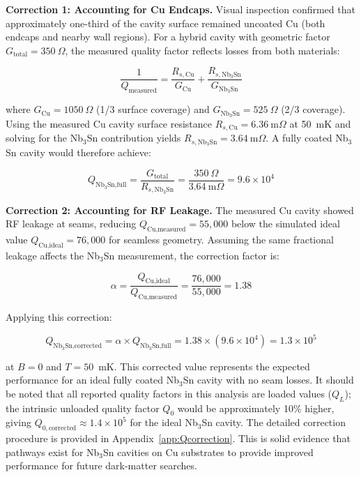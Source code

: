     \textbf{Correction 1: Accounting for Cu Endcaps.} Visual inspection confirmed that approximately one-third of the cavity surface remained uncoated Cu (both endcaps and nearby wall regions). For a hybrid cavity with geometric factor $G_\text{total} = 350~\Omega$, the measured quality factor reflects losses from both materials:
    
    \begin{equation}
    \frac{1}{Q_\text{measured}} = \frac{R_{s,\text{Cu}}}{G_\text{Cu}} + \frac{R_{s,\text{Nb$_3$Sn}}}{G_\text{Nb$_3$Sn}}
    \end{equation}
    
    \noindent where $G_\text{Cu} = 1050~\Omega$ (1/3 surface coverage) and $G_\text{Nb$_3$Sn} = 525~\Omega$ (2/3 coverage). Using the measured Cu cavity surface resistance $R_{s,\text{Cu}} = 6.36~\text{m}\Omega$ at 50~mK and solving for the Nb$_3$Sn contribution yields $R_{s,\text{Nb$_3$Sn}} = 3.64~\text{m}\Omega$. A fully coated Nb$_3$Sn cavity would therefore achieve:
    
    \begin{equation}
    Q_\text{Nb$_3$Sn,full} = \frac{G_\text{total}}{R_{s,\text{Nb$_3$Sn}}} = \frac{350~\Omega}{3.64~\text{m}\Omega} = 9.6 \times 10^4
    \end{equation}
    
    \textbf{Correction 2: Accounting for RF Leakage.} The measured Cu cavity showed RF leakage at seams, reducing $Q_\text{Cu,measured} = 55{,}000$ below the simulated ideal value $Q_\text{Cu,ideal} = 76{,}000$ for seamless geometry. Assuming the same fractional leakage affects the Nb$_3$Sn measurement, the correction factor is:
    
    \begin{equation}
    \alpha = \frac{Q_\text{Cu,ideal}}{Q_\text{Cu,measured}} = \frac{76{,}000}{55{,}000} = 1.38
    \end{equation}
    
    Applying this correction:
    
    \begin{equation}
    Q_\text{Nb$_3$Sn,corrected} = \alpha \times Q_\text{Nb$_3$Sn,full} = 1.38 \times (9.6 \times 10^4) = 1.3 \times 10^5
    \end{equation}
    
    \noindent at $B = 0$ and $T = 50$~mK. This corrected value represents the expected performance for an ideal fully coated Nb$_3$Sn cavity with no seam losses. It should be noted that all reported quality factors in this analysis are loaded values ($Q_L$); the intrinsic unloaded quality factor $Q_0$ would be approximately 10\% higher, giving $Q_{0,\text{corrected}} \approx 1.4 \times 10^5$ for the ideal Nb$_3$Sn cavity. The detailed correction procedure is provided in Appendix~\ref{app:Qcorrection}. This is solid evidence that pathways exist for Nb$_3$Sn cavities on Cu substrates to provide improved performance for future dark-matter searches.
    
